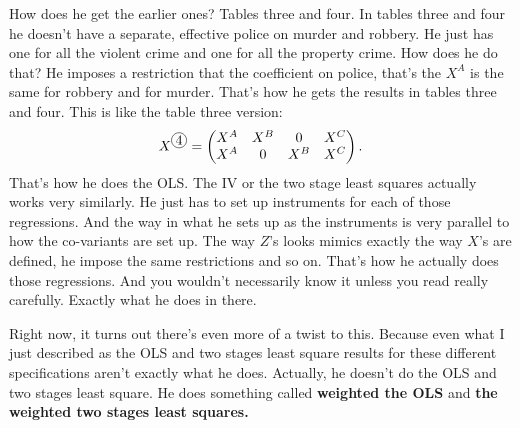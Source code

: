 \documentclass[11pt,a4paper]{amsart}
\theoremstyle{plain}
\theoremstyle{definition}
\newcommand*\circled[1]{\tikz[baseline=(char.base)]{
		\node[shape=circle,draw,inner sep=1pt] (char) {#1};}} %
\begin{document}
			   How does he get the earlier ones? Tables three and four. In tables three and four he doesn't have a separate, effective police on murder and robbery. He just has one for all the violent crime and one for all the property crime. How does he do that? He imposes a restriction that the coefficient on police, that's the $X^{A}$ is the same for robbery and for murder. That's how he gets the results in tables three and four. This is like the table three version:
			   \[	X^{\circled{4}}  = \begin{pmatrix}
			   X^{A} & X^{B} & 0 & X^{C} \\
			   X^{A}  & 0 & X^{B} & X^{C} 
			   \end{pmatrix}.	\]
			   That's how he does the OLS. The IV or the two stage least squares actually works very similarly. He just has to set up instruments for each of those regressions. And the way in what he sets up as the instruments is very parallel to how the co-variants are set up. The way $Z$'s looks mimics exactly the way $X$'s are defined, he impose the same restrictions and so on. That's how he actually does those regressions. And you wouldn't necessarily know it unless you read really carefully. Exactly what he does in there. \par 
			   Right now, it turns out there's even more of a twist to this. Because even what I just described as the OLS and two stages least square results for these different specifications aren't exactly what he does. Actually, he doesn't do  the OLS and two stages least square. He does something called \textbf{weighted the OLS} and \textbf{the weighted two stages least squares.}
\end{document}
